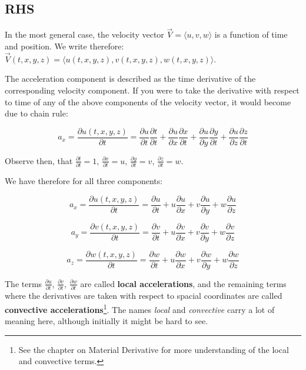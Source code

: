 \subsection{RHS}

In the most general case, the velocity vector $\vec{V} = \langle u, v, w \rangle$ is a function of time and position. We write therefore: $\vec{V}(t, x, y, z) = \langle u(t, x, y, z), v(t, x, y, z), w(t, x, y, z) \rangle $.

The acceleration component is described as the time derivative of the corresponding velocity component. If you were to take the derivative with respect to time of any of the above components of the velocity vector, it would become due to chain rule:

\begin{equation}
a_x = \frac{\partial u(t,x,y,z)}{\partial t} = \frac{\partial u}{\partial t} \frac{\partial t}{\partial t} + \frac{\partial u}{\partial x} \frac{\partial x}{\partial t} + \frac{\partial u}{\partial y} \frac{\partial y}{\partial t} + \frac{\partial u}{\partial z} \frac{\partial z}{\partial t}
\end{equation}

Observe then, that $\frac{\partial t}{\partial t} = 1$, $\frac{\partial x}{\partial t} = u$, $\frac{\partial y}{\partial t} = v$, $\frac{\partial z}{\partial t} = w$.

We have therefore for all three components:

\begin{equation}
a_x = \frac{\partial u(t,x,y,z)}{\partial t} = \frac{\partial u}{\partial t} + u \frac{\partial u}{\partial x} + v \frac{\partial u}{\partial y} + w \frac{\partial u}{\partial z}
\end{equation}

\begin{equation}
a_y = \frac{\partial v(t,x,y,z)}{\partial t} = \frac{\partial v}{\partial t} + u \frac{\partial v}{\partial x} + v \frac{\partial v}{\partial y} + w \frac{\partial v}{\partial z}
\end{equation}

\begin{equation}
a_z = \frac{\partial w(t,x,y,z)}{\partial t} = \frac{\partial w}{\partial t} + u \frac{\partial w}{\partial x} + v \frac{\partial w}{\partial y} + w \frac{\partial w}{\partial z}
\end{equation}

The terms $\frac{\partial u}{\partial t}$, $\frac{\partial v}{\partial t}$, $\frac{\partial w}{\partial t}$ are called \textbf{local accelerations}, and the remaining terms where the derivatives are taken with respect to spacial coordinates are called \textbf{convective accelerations}\footnote{See the chapter on Material Derivative for more understanding of the local and convective terms.}. The names \textit{local} and \textit{convective} carry a lot of meaning here, although initially it might be hard to see. 


